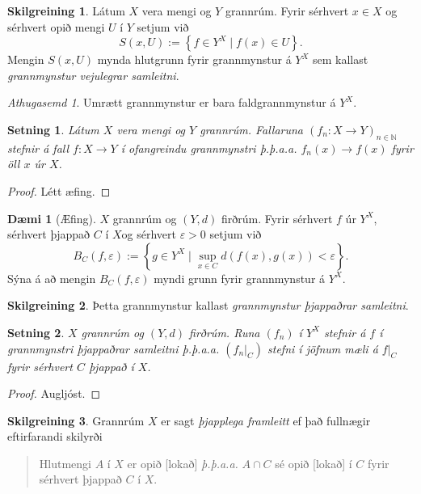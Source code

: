 \documentclass[a4paper,icelandic]{book}
\theoremstyle{definition}
\newtheorem{skilgr}{Skilgreining}[section]
\newtheorem{daemi}{Dæmi}[section]
\theoremstyle{plain}
\newtheorem{setn}{Setning}[section]
\theoremstyle{remark}
\newtheorem*{ath}{Athugasemd}
\newcommand{\N}{\mathbb{N}} %
\begin{document}
\begin{skilgr}
  Látum $X$ vera mengi og $Y$ grannrúm. Fyrir sérhvert $x\in X$ og
  sérhvert opið mengi $U$ í $Y$ setjum við\[
  S(x,U) := \left\{ f\in Y^X\mid f(x)\in U \right\}.
  \]
  Mengin $S(x,U)$ mynda hlutgrunn fyrir grannmynstur á $Y^X$ sem kallast
  \emph{grannmynstur vejulegrar samleitni}.
\end{skilgr}
\begin{ath}
  Umrætt grannmynstur er bara faldgrannmynstur á $Y^X$.
\end{ath}
\begin{setn}
  Látum $X$ vera mengi og $Y$ grannrúm. Fallaruna $(f_n:X\to
  Y)_{n\in\N}$ stefnir á fall $f:X\to Y$ í ofangreindu grannmynstri
  \emph{þ.þ.a.a.} $f_n(x)\to f(x)$ fyrir öll $x$ úr $X$.
\end{setn}
\begin{proof}
  Létt æfing.
\end{proof}
\begin{daemi}
  [Æfing]
  $X$ grannrúm og $(Y,d)$ firðrúm. Fyrir sérhvert $f$ úr $Y^X$,
  sérhvert þjappað $C$ í $X$og sérhvert $\varepsilon>0$ setjum við\[
  B_C(f,\varepsilon)
  := \left\{ g\in Y^X \mid \sup_{x\in C} d(f(x),g(x))<\varepsilon
  \right\}.
  \]
  Sýna á að mengin $B_C(f,\varepsilon)$ myndi grunn fyrir grannmynstur á
  $Y^X$.
\end{daemi}
\begin{skilgr}
  Þetta grannmynstur kallast \emph{grannmynstur þjappaðrar
  samleitni}.
\end{skilgr}
\begin{setn}
  $X$ grannrúm og $(Y,d)$ firðrúm. Runa $(f_n)$ í $Y^X$ stefnir á $f$ í
  grannmynstri þjappaðrar samleitni \emph{þ.þ.a.a.} $(f_n|_C)$ stefni í
  jöfnum mæli á $f|_C$ fyrir sérhvert $C$ þjappað í $X$.
\end{setn}
\begin{proof}
  Augljóst.
\end{proof}
\begin{skilgr}
  Grannrúm $X$ er sagt \emph{þjapplega framleitt} ef það fullnægir eftirfarandi
  skilyrði
  \begin{quote}
    Hlutmengi $A$ í $X$ er opið [lokað] \emph{þ.þ.a.a.} $A\cap C$ sé
    opið [lokað] í $C$ fyrir sérhvert þjappað $C$ í $X$.
  \end{quote}
\end{skilgr}
\end{document}
